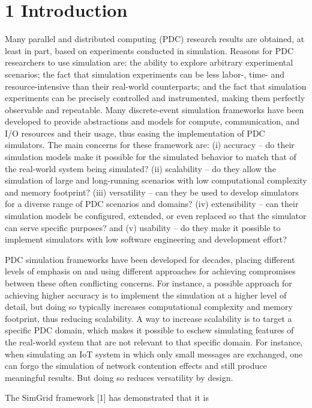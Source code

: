 \documentclass[
]{article}
\begin{document}
\section{1 Introduction}\label{introduction}

Many parallel and distributed computing (PDC) research results are
obtained, at least in part, based on experiments conducted in
simulation. Reasons for PDC researchers to use simulation are: the
ability to explore arbitrary experimental scenarios; the fact that
simulation experiments can be less labor-, time- and resource-intensive
than their real-world counterparts; and the fact that simulation
experiments can be precisely controlled and instrumented, making them
perfectly observable and repeatable. Many discrete-event simulation
frameworks have been developed to provide abstractions and models for
compute, communication, and I/O resources and their usage, thus easing
the implementation of PDC simulators. The main concerns for these
framework are: (i) accuracy -- do their simulation models make it
possible for the simulated behavior to match that of the real-world
system being simulated? (ii) scalability -- do they allow the simulation
of large and long-running scenarios with low computational complexity
and memory footprint? (iii) versatility -- can they be used to develop
simulators for a diverse range of PDC scenarios and domains? (iv)
extensibility -- can their simulation models be configured, extended, or
even replaced so that the simulator can serve specific purposes? and (v)
usability -- do they make it possible to implement simulators with low
software engineering and development effort?

PDC simulation frameworks have been developed for decades, placing
different levels of emphasis on and using different approaches for
achieving compromises between these often conflicting concerns. For
instance, a possible approach for achieving higher accuracy is to
implement the simulation at a higher level of detail, but doing so
typically increases computational complexity and memory footprint, thus
reducing scalability. A way to increase scalability is to target a
specific PDC domain, which makes it possible to eschew simulating
features of the real-world system that are not relevant to that specific
domain. For instance, when simulating an IoT system in which only small
messages are exchanged, one can forgo the simulation of network
contention effects and still produce meaningful results. But doing so
reduces versatility by design.

The SimGrid framework {[}1{]} has demonstrated that it is
\end{document}
